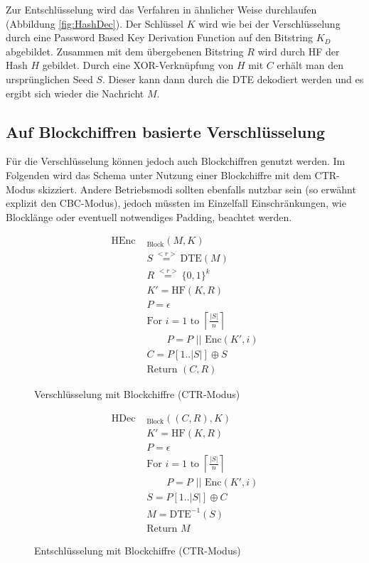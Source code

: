 Zur Entschlüsselung wird das Verfahren in ähnlicher Weise durchlaufen (Abbildung \ref{fig:HashDec}). Der Schlüssel \(K\) wird wie bei der Verschlüsselung durch eine Password Based Key Derivation Function auf den Bitstring \(K_D\) abgebildet. Zusammen mit dem übergebenen Bitstring \(R\) wird durch HF der Hash \(H\) gebildet. Durch eine XOR-Verknüpfung von \(H\) mit \(C\) erhält man den ursprünglichen Seed \(S\). Dieser kann dann durch die DTE  dekodiert werden und es ergibt sich wieder die Nachricht \(M\).

\subsection{Auf Blockchiffren basierte Verschlüsselung}

Für die Verschlüsselung können jedoch auch Blockchiffren genutzt werden. Im Folgenden wird das Schema unter Nutzung einer Blockchiffre mit dem CTR-Modus skizziert. Andere Betriebsmodi sollten ebenfalls nutzbar sein (so erwähnt \cite{EURO2014} explizit den CBC-Modus), jedoch müssten im Einzelfall Einschränkungen, wie Blocklänge oder eventuell notwendiges Padding, beachtet werden. 

\begin{figure}[h]
	\begin{minipage}[b]{0.5\textwidth}
		\begin{align*}
			\text{HEnc }&_{\text{Block}}(M, K)\\
			&S \overset{<r>}{=} \text{DTE}(M)\\ 	%
			&R \overset{<r>}{=} \{0,1\}^k\\	%
			&K' = \text{HF}(K,R)\\ 		%
			&P = \epsilon \\
			&\text{For } i = 1 \text{ to } \left\lceil \frac{|S|}{n} \right\rceil \\
			&\qquad P = P \text{ || Enc}(K',i)\\	%
			&C = P[1 .. |S|] \oplus S\\	%
			&\text{Return } (C,R)
		\end{align*}
		\caption{Verschlüsselung mit Blockchiffre (CTR-Modus)}
		\label{fig:BlockEnc}
	\end{minipage}
	\begin{minipage}[b]{0.5\textwidth}
		\begin{align*}
			\text{HDec }&_{\text{Block}}((C,R), K)\\
			&K' = \text{HF}(K,R)\\ 		%
			&P = \epsilon \\
			&\text{For } i = 1 \text{ to } \left\lceil \frac{|S|}{n} \right\rceil \\
			&\qquad P = P \text{ || Enc}(K',i)\\	%
			&S = P[1 .. |S|] \oplus C\\	%
			&M = \text{DTE}^{-1}(S)\\ 	%
			&\text{Return } M
		\end{align*}
		\caption{Entschlüsselung mit Blockchiffre (CTR-Modus)}
		\label{fig:BlockDec}
	\end{minipage}
\end{figure}

